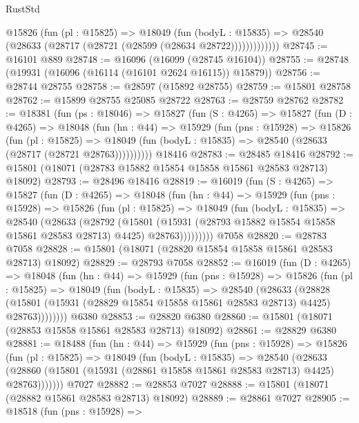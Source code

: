 \begin{lexlean}{RustStd}
\begin{coremodule}
              @15826
                (fun (pl : @15825) =>
                @18049
                  (fun (bodyL : @15835) =>
                  @28540 (@28633 (@28717 (@28721 (@28599 (@28634 @28722)))))))))))))
@28745 := @16101 @889
@28748 := @16096 (@16099 (@28745 @16104))
@28755 := @28748 (@19931 (@16096 (@16114 (@16101 @2624 @16115)) @15879))
@28756 := @28744 @28755
@28758 := @28597 (@15892 @28755)
@28759 := @15801 @28758
@28762 := @15899 @28755 @25085 @28722
@28763 := @28759 @28762
@28782 := @18381
    (fun (ps : @18046) =>
    @15827
      (fun (S : @4265) =>
      @15827
        (fun (D : @4265) =>
        @18048
          (fun (hn : @44) =>
          @15929
            (fun (pns : @15928) =>
            @15826
              (fun (pl : @15825) =>
              @18049 (fun (bodyL : @15835) => @28540 (@28633 (@28717 (@28721 @28763))))))))))
    @18416
@28783 := @28485 @18416
@28792 := @15801 (@18071 (@28783 @15882 @15854 @15858 @15861 @28583 @28713) @18092)
@28793 := @28496 @18416
@28819 := @16019
    (fun (S : @4265) =>
    @15827
      (fun (D : @4265) =>
      @18048
        (fun (hn : @44) =>
        @15929
          (fun (pns : @15928) =>
          @15826
            (fun (pl : @15825) =>
            @18049
              (fun (bodyL : @15835) =>
              @28540
                (@28633
                  (@28792
                    (@15801
                      (@15931 (@28793 @15882 @15854 @15858 @15861 @28583 @28713) @4425)
                      @28763)))))))))
    @7058
@28820 := @28783 @7058
@28828 := @15801 (@18071 (@28820 @15854 @15858 @15861 @28583 @28713) @18092)
@28829 := @28793 @7058
@28852 := @16019
    (fun (D : @4265) =>
    @18048
      (fun (hn : @44) =>
      @15929
        (fun (pns : @15928) =>
        @15826
          (fun (pl : @15825) =>
          @18049
            (fun (bodyL : @15835) =>
            @28540
              (@28633
                (@28828
                  (@15801 (@15931 (@28829 @15854 @15858 @15861 @28583 @28713) @4425) @28763))))))))
    @6380
@28853 := @28820 @6380
@28860 := @15801 (@18071 (@28853 @15858 @15861 @28583 @28713) @18092)
@28861 := @28829 @6380
@28881 := @18488
    (fun (hn : @44) =>
    @15929
      (fun (pns : @15928) =>
      @15826
        (fun (pl : @15825) =>
        @18049
          (fun (bodyL : @15835) =>
          @28540
            (@28633
              (@28860 (@15801 (@15931 (@28861 @15858 @15861 @28583 @28713) @4425) @28763)))))))
    @7027
@28882 := @28853 @7027
@28888 := @15801 (@18071 (@28882 @15861 @28583 @28713) @18092)
@28889 := @28861 @7027
@28905 := @18518
    (fun (pns : @15928) =>

\end{coremodule}
\end{lexlean}
